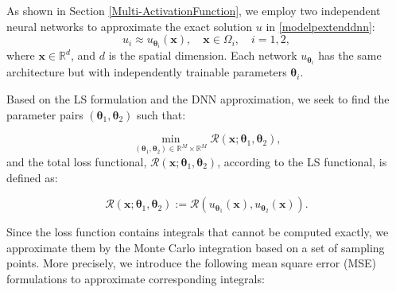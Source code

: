 \documentclass{article}
\begin{document}
As shown in Section \ref{Multi-ActivationFunction}, we employ two independent neural networks to approximate the exact solution $u$ in \eqref{modelpextenddnn}:
$$
u_i \approx u_{\boldsymbol{\theta}_i}(\boldsymbol{x}), \quad \boldsymbol{x} \in \Omega_i, \quad i = 1, 2,
$$
where $\boldsymbol{x} \in \mathbb{R}^d$, and $d$ is the spatial dimension. Each network $u_{\boldsymbol{\theta}_i}$ has the same architecture but with independently trainable parameters $\boldsymbol{\theta}_i$.

Based on the LS formulation and the DNN approximation, we seek to find the parameter pairs $(\boldsymbol{\theta}_1, \boldsymbol{\theta}_2)$ such that:

$$
\min_{(\boldsymbol{\theta}_1, \boldsymbol{\theta}_2) \in \mathbb{R}^M \times \mathbb{R}^M} \mathcal{R}(\boldsymbol{x};\boldsymbol{\theta}_1, \boldsymbol{\theta}_2),
$$
and the total loss functional, $\mathcal{R}(\boldsymbol{x};\boldsymbol{\theta}_1, \boldsymbol{\theta}_2)$, according to the LS functional, is defined as:

\begin{equation}
    \mathcal{R}(\boldsymbol{x};\boldsymbol{\theta}_1, \boldsymbol{\theta}_2) := \mathcal{R}(u_{\boldsymbol{\theta}_1}(\boldsymbol{x}), u_{\boldsymbol{\theta}_2}(\boldsymbol{x})).
\end{equation}

Since the loss function contains integrals that cannot be computed exactly, we approximate them by the Monte Carlo integration based on a set of sampling points. More precisely, we introduce the following mean square error (MSE) formulations to approximate corresponding integrals:
\end{document}
